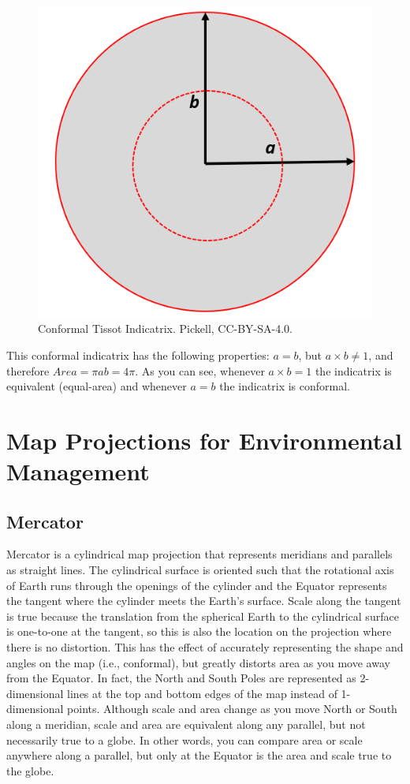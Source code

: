 \documentclass[
]{book}
\begin{document}
\begin{figure}
\includegraphics[width=0.75\linewidth]{images/02-conformal-indicatrix} \caption{Conformal Tissot Indicatrix. Pickell, CC-BY-SA-4.0.}\label{fig:2-conformal-indicatrix}
\end{figure}

This conformal indicatrix has the following properties: \(a=b\), but \(a×b≠1\), and therefore \(Area=πab=4π\). As you can see, whenever \(a×b=1\) the indicatrix is equivalent (equal-area) and whenever \(a=b\) the indicatrix is conformal.

\section{Map Projections for Environmental Management}\label{map-projections-for-environmental-management}

\subsection{Mercator}\label{mercator}

Mercator is a cylindrical map projection that represents meridians and parallels as straight lines. The cylindrical surface is oriented such that the rotational axis of Earth runs through the openings of the cylinder and the Equator represents the tangent where the cylinder meets the Earth's surface. Scale along the tangent is true because the translation from the spherical Earth to the cylindrical surface is one-to-one at the tangent, so this is also the location on the projection where there is no distortion. This has the effect of accurately representing the shape and angles on the map (i.e., conformal), but greatly distorts area as you move away from the Equator. In fact, the North and South Poles are represented as 2-dimensional lines at the top and bottom edges of the map instead of 1-dimensional points. Although scale and area change as you move North or South along a meridian, scale and area are equivalent along any parallel, but not necessarily true to a globe. In other words, you can compare area or scale anywhere along a parallel, but only at the Equator is the area and scale true to the globe.
\end{document}
